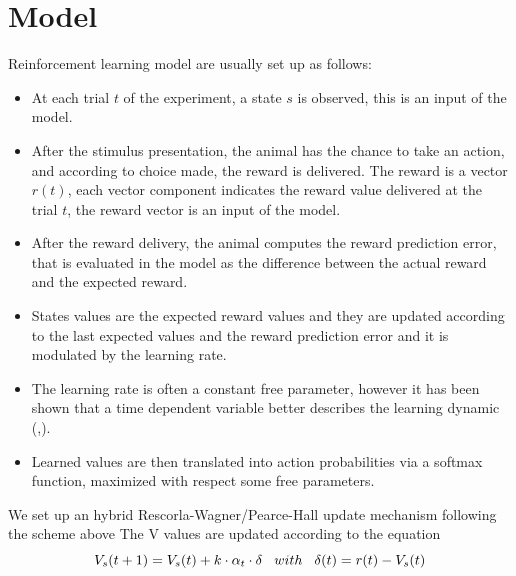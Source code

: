 \section{Model}
Reinforcement learning model are usually set up as follows:
\begin{itemize}
    \item At each trial $t$ of the experiment, a state $s$ is observed, this is an input of the model.
    \item After the stimulus presentation, the animal has the chance to take an action, and according to choice made, the reward is delivered. The reward is a vector $r(t)$, each vector component indicates the reward value delivered at the trial $t$, the reward vector is an input of the model.
    \item After the reward delivery, the animal computes the reward prediction error, that is evaluated in the model as the difference between the actual reward and the expected reward.
    \item States values are the expected reward values and they are updated according to the last expected values and the reward prediction error and it is modulated by the learning rate.
    \item The learning rate is often a constant free parameter, however it has been shown that a time dependent variable better describes the learning dynamic (\cite{Funamizu},\cite{Daw}).
    \item Learned values are then translated into action probabilities via a softmax function, maximized with respect some free parameters.
\end{itemize}
We set up an hybrid Rescorla-Wagner/Pearce-Hall update mechanism following the scheme above
The V values are updated according to the equation
\begin{equation}
V_s(t+1)=V_s(t)+k\cdot\alpha_t\cdot\delta  \hspace{0.3cm} with \hspace{0.3cm}\delta(t)=r(t)-V_s(t)
\label{VValues}
\end{equation}

